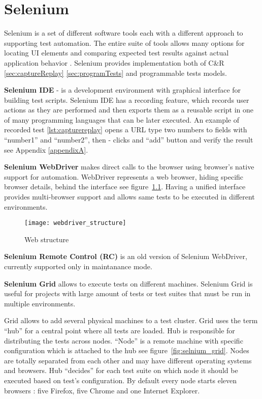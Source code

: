 	\chapter {Selenium}
	\label{ch:selenium}
      Selenium is a set of different software tools each with a different approach
       to supporting test automation. The entire suite of tools allows many
       options for locating UI elements and comparing expected test results
       against actual application behavior \cite{seleniumSite}.
       Selenium provides implementation both of C\&R \ref{sec:captureReplay}
       \ref{sec:programTests} and programmable tests models.  
       
       \textbf{Selenium IDE} - is a development environment with graphical
       interface for building test scripts.
		Selenium IDE has a recording feature,  which records user actions as they are
		performed and then exports them as a reusable script in one of many programming languages that can be later executed.
		An example of recorded test \ref{lst:capturereplay} opens a URL type two
		numbers to fields with ``number1'' and ``number2'', then -
		clicks and ``add'' button and verify the result see Appendix \ref{appendixA}.
		
       \textbf{Selenium  WebDriver} makes direct calls to the browser using browser's native support for automation. WebDriver represents a web browser, hiding specific browser details, behind the interface see
       figure~\ref{fig:webdriver}. Having a unified interface provides
       multi-browser support and allows same tests to be executed in different
       environments.
       
	  \begin{figure}
	  \centering
  		\texttt{[image: webdriver\_structure]}
  		\caption{Web structure}
  		\label{fig:webdriver}
		\end{figure}
		
    	\textbf{Selenium Remote Control (RC)} is an old version of Selenium
    	WebDriver, currently supported only in maintanance mode.
       
       \textbf{Selenium Grid} allows to execute tests on different machines.
       Selenium Grid is useful for projects with large amount of tests or test
       suites that must be run in multiple environments.
       
		Grid allows to add several physical machines to a test cluster. Grid uses the
		term ``hub'' for a central point where all tests are loaded. Hub is responsible
		for distributing the tests across nodes. ``Node'' is  a remote machine with
		specific configuration which is attached to the hub see
		figure~\ref{fig:selnium_grid}. Nodes are totally separated from each other and
		may have different operating systems and browsers. Hub ``decides''
		for each test suite on which node it should be executed based on test's configuration.
		By default every node starts eleven browsers : five Firefox, five Chrome and
		one Internet Explorer.
		

